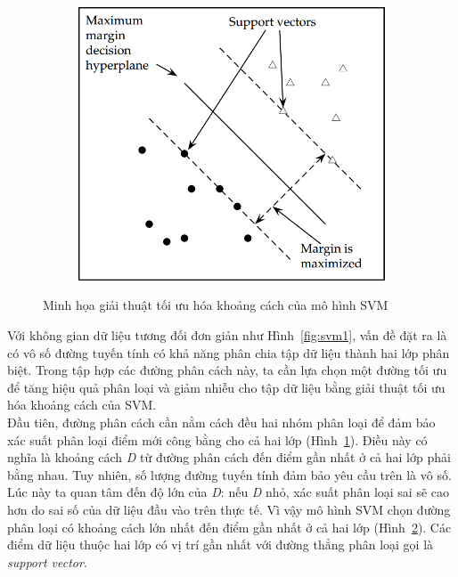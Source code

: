 \begin{figure}[h]
\begin{subfigure}[b]{0.325\textwidth}
        \caption{ }
        \label{fig:svm2}
    \end{subfigure}
    \begin{subfigure}[b]{0.325\textwidth}    \centering
        \includegraphics[width=\textwidth]{hinh/SVM4.png}
        \caption{ }
        \label{fig:svm3}
    \end{subfigure}
    \caption[Caption for LOF]{Minh họa giải thuật tối ưu hóa khoảng cách của mô hình SVM \cite{manning2009anintroduction}}
    \label{fig:svm}
\end{figure}
Với không gian dữ liệu tương đối đơn giản như Hình~\ref{fig:svm1}, vấn đề đặt ra là có vô số đường tuyến tính có khả năng phân chia tập dữ liệu thành hai lớp phân biệt. Trong tập hợp các đường phân cách này, ta cần lựa chọn một đường tối ưu để tăng hiệu quả phân loại và giảm nhiễu cho tập dữ liệu bằng giải thuật tối ưu hóa khoảng cách của SVM.\\

Đầu tiên, đường phân cách cần nằm cách đều hai nhóm phân loại để đảm bảo xác suất phân loại điểm mới công bằng cho cả hai lớp (Hình~\ref{fig:svm2}). Điều này có nghĩa là khoảng cách \textit{D} từ đường phân cách đến điểm gần nhất ở cả hai lớp  phải bằng nhau. Tuy nhiên, số lượng đường tuyến tính đảm bảo yêu cầu trên là vô số. Lúc này ta quan tâm đến độ lớn của \textit{D}: nếu \textit{D} nhỏ, xác suất phân loại sai sẽ cao hơn do sai số của dữ liệu đầu vào trên thực tế. Vì vậy mô hình SVM chọn đường phân loại có khoảng cách lớn nhất đến điểm gần nhất ở cả hai lớp (Hình~\ref{fig:svm3}). Các điểm dữ liệu thuộc hai lớp có vị trí gần nhất với đường thẳng phân loại gọi là \textit{support vector}.

